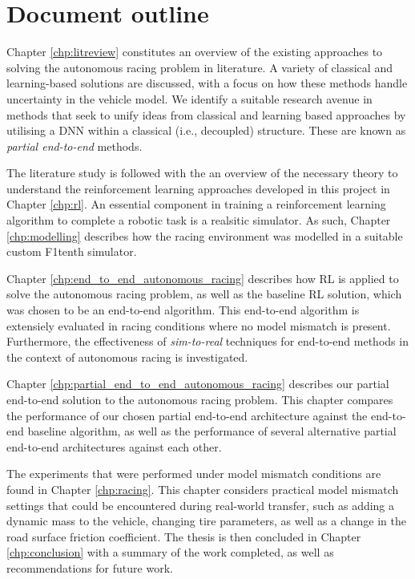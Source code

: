 


\section{Document outline}\label{sec:outline}

Chapter \ref{chp:litreview} constitutes an overview of the existing approaches to solving the autonomous racing problem in literature.
A variety of classical and learning-based solutions are discussed, with a focus on how these methods handle uncertainty in the vehicle model.
We identify a suitable research avenue in methods that seek to unify ideas from classical and learning based approaches by utilising a DNN within a classical (i.e., decoupled) structure.
These are known as \emph{partial end-to-end} methods.

The literature study is followed with the an overview of the necessary theory to understand the reinforcement learning approaches developed in this project in Chapter \ref{chp:rl}.
An essential component in training a reinforcement learning algorithm to complete a robotic task is a realsitic simulator.
As such, Chapter \ref{chp:modelling} describes how the racing environment was modelled in a suitable custom F1tenth simulator.

Chapter \ref{chp:end_to_end_autonomous_racing} describes how RL is applied to solve the autonomous racing problem, as well as the  baseline RL solution, which was chosen to be an end-to-end algorithm.
This end-to-end algorithm is extensiely evaluated in racing conditions where no model mismatch is present.
Furthermore, the effectiveness of \emph{sim-to-real} techniques for end-to-end methods in the context of autonomous racing is investigated.

Chapter \ref{chp:partial_end_to_end_autonomous_racing} describes our partial end-to-end solution to the autonomous racing problem.
This chapter compares the performance of our chosen partial end-to-end architecture against the end-to-end baseline algorithm, 
as well as the performance of several alternative partial end-to-end architectures against each other.

The experiments that were performed under model mismatch conditions are found in Chapter \ref{chp:racing}.
This chapter considers practical model mismatch settings that could be encountered during real-world transfer, such as adding a dynamic mass to the vehicle, 
changing tire parameters, as well as a change in the road surface friction coefficient.
The thesis is then concluded in Chapter \ref{chp:conclusion} with a summary of the work completed, as well as recommendations for future work.
